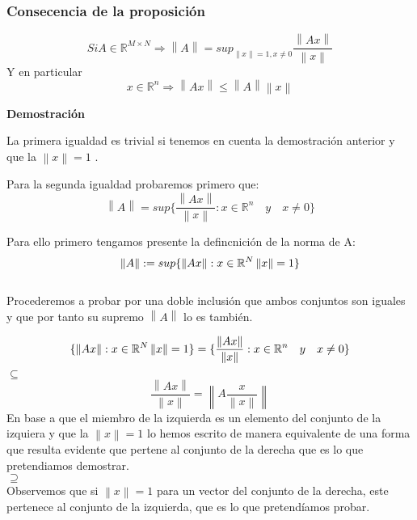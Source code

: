 \documentclass[a4paper , 11pt, spanish ]{article}
\newcommand{\norm}[1]{\left\lVert#1\right\rVert}
\begin{document}
\subsubsection{ Consecencia de la proposición }

$$ Si A \in  \mathbb{R}^{M \times N}  \Rightarrow  \norm{A}= sup_{\norm{x}=1 , x \not = 0 }\frac{ \norm {Ax}}{ \norm{x}}  $$ 
Y en particular 
$$ x \in \mathbb{R}^n \Rightarrow \norm{Ax} \le \norm{A} \norm{x} $$ 
\par 
\textbf{Demostración} 
\par 
La primera igualdad es trivial si tenemos en cuenta la demostración anterior y que la $\norm{x}=1$ . 
\par 
Para la segunda igualdad probaremos primero que: 
$$ \norm{A} = sup \{ \frac{ \norm{Ax}}{\norm{x}} : x \in \mathbb{R}^n \quad y \quad  x \not = 0\}$$
\par Para ello primero tengamos presente la defincnición de la norma de A: 
\\ \[ \norm{A} := sup \{ \norm{Ax} :  x \in \mathbb{R}^N \\ \norm{x}= 1 \} \]  
\\   
Procederemos a probar por una doble inclusión que ambos conjuntos son iguales y que por tanto su supremo $\norm{A}$ lo es también. 
\par 
 \[ \{ \norm{Ax} :  x \in \mathbb{R}^N \\ \norm{x}= 1 \}  = \{ \frac{ \norm{Ax}}{\norm{x}} : x \in \mathbb{R}^n \quad y \quad  x \not = 0\} \]  
$\subseteq $
\\ 
$$ \frac{ \norm{Ax}}{\norm{x}}  = \norm{A \frac{x}{\norm{x}}} $$ 
En base a que el miembro de la izquierda es un elemento del conjunto de la izquiera y que la $\norm{x} = 1$ lo hemos escrito de manera equivalente de una forma que resulta evidente que pertene al conjunto de la derecha que es lo que pretendiamos demostrar. 
\\
$\supseteq$ 
\\
Observemos que si $\norm{x} = 1 $ para un vector del conjunto de la derecha, este pertenece al conjunto de la izquierda, que es lo que pretendíamos probar. 
\end{document}
